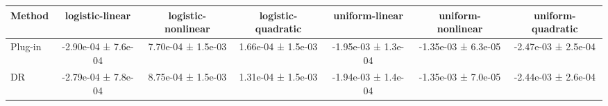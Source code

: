 \begin{tabular}{lcccccc}
\toprule
Method & logistic-linear & logistic-nonlinear & logistic-quadratic & uniform-linear & uniform-nonlinear & uniform-quadratic \\
\midrule
Plug-in & -2.90e-04 ± 7.6e-04 & 7.70e-04 ± 1.5e-03 & 1.66e-04 ± 1.5e-03 & -1.95e-03 ± 1.3e-04 & -1.35e-03 ± 6.3e-05 & -2.47e-03 ± 2.5e-04 \\
DR & -2.79e-04 ± 7.8e-04 & 8.75e-04 ± 1.5e-03 & 1.31e-04 ± 1.5e-03 & -1.94e-03 ± 1.4e-04 & -1.35e-03 ± 7.0e-05 & -2.44e-03 ± 2.6e-04 \\
\bottomrule
\end{tabular}
